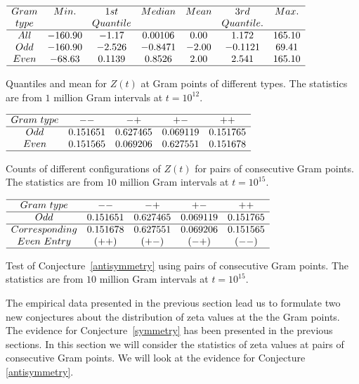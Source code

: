 \documentclass[twoside]{article}
\theoremstyle{definition}
\begin{document}
\begin{table}
\centering \(\begin{array}{ccccccc}
\hline
 Gram &     Min.   & 1st    &  Median    &   Mean   & 3rd    &   Max. \\
 type &              & Quantile   &            &              & Quantile.    &   \\
\hline
All& -160.90 &   -1.17 &    0.00106 &   0.00  &  1.172 &165.10\\
Odd&-160.90 &   -2.526 &   -0.8471  & -2.00 &   -0.1121 &  69.41 \\
Even&-68.63 &   0.1139 &  0.8526  & 2.00 &   2.541 & 165.10 \\
\hline
\end{array}\)
\caption{Quantiles and mean for  $Z(t)$ at Gram points of different types.  The statistics are from $1$ million Gram intervals at $t=10^{12}$.} \label{tab:quantiles}
\end{table}


\begin{table}
\centering \(\begin{array}{ccccc}
\hline
 Gram~type&   --   & -+   & +-   & ++  \\
\hline
Odd & 0.151651&0.627465&0.069119&0.151765 \\
Even & 0.151565&0.069206&0.627551&0.151678 \\
\hline
\end{array}\)
\caption{Counts of different configurations of $Z(t)$  for pairs of consecutive Gram points.  The statistics are from $10$ million Gram intervals at $t=10^{15}$.} \label{tab:pairraw}
\end{table}

\begin{table}
\centering \(\begin{array}{ccccc}
\hline
 Gram~type&   --   & -+   & +-   & ++  \\
\hline
Odd & 0.151651&0.627465&0.069119&0.151765\\
\hline
Corresponding& 0.151678 & 0.627551 & 0.069206& 0.151565\\ 
Even~Entry     & (++)     & (+-)   & (-+)  & (--) \\
\hline
\end{array}\)
\caption{Test of Conjecture~\ref{antisymmetry} using pairs of consecutive Gram points.  The statistics are from $10$ million Gram intervals at $t=10^{15}$.} \label{tab:pairtest}
\end{table}


The empirical data presented in the previous section lead us to formulate two new conjectures  about the distribution of zeta values at the 
the Gram points. 
The evidence for  Conjecture~\ref{symmetry} has been presented in the previous sections. 
In this section we will consider the statistics of zeta values at pairs of consecutive Gram points. We will look at the evidence for Conjecture \ref{antisymmetry}.  
\end{document}

